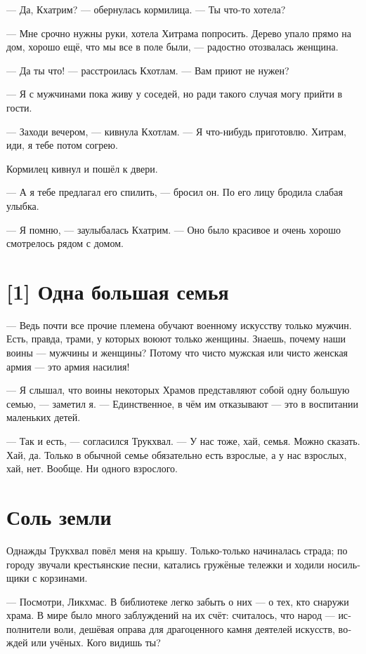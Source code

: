 \documentclass[a4paper,12pt,fleqn]{book}\usepackage{polyglossia}\setdefaultlanguage[babelshorthands=true]{russian}\setotherlanguage{english}\defaultfontfeatures{Ligatures=TeX,Mapping=tex-text}\usepackage{xcolor}\newcommand{\ml}[3]{#2}
\begin{document}
{--- Да, Кхатрим? --- обернулась кормилица.
--- Ты что-то хотела?

--- Мне срочно нужны руки, хотела Хитрама попросить.
Дерево упало прямо на дом, хорошо ещё, что мы все в поле были, --- радостно отозвалась женщина.

--- Да ты что! --- расстроилась Кхотлам.
--- Вам приют не нужен?

--- Я с мужчинами пока живу у соседей, но ради такого случая могу прийти в гости.

--- Заходи вечером, --- кивнула Кхотлам.
--- Я что-нибудь приготовлю.
Хитрам, иди, я тебе потом согрею.

Кормилец кивнул и пошёл к двери.

--- А я тебе предлагал его спилить, --- бросил он.
По его лицу бродила слабая улыбка.

--- Я помню, --- заулыбалась Кхатрим.
--- Оно было красивое и очень хорошо смотрелось рядом с домом.

\section{[1] Одна большая семья}

--- Ведь почти все прочие племена обучают военному искусству только мужчин.
Есть, правда, трами, у которых воюют только женщины.
Знаешь, почему наши воины --- мужчины и женщины?
Потому что чисто мужская или чисто женская армия --- это армия насилия!

--- Я слышал, что воины некоторых Храмов представляют собой одну большую семью, --- заметил я.
--- Единственное, в чём им отказывают --- это в воспитании маленьких детей.

--- Так и есть, --- согласился Трукхвал.
--- У нас тоже, хай, семья.
Можно сказать.
Хай, да.
Только в обычной семье обязательно есть взрослые, а у нас взрослых, хай, нет.
Вообще.
Ни одного взрослого.

\section{Соль земли}

Однажды Трукхвал повёл меня на крышу.
Только-только начиналась страда;
по городу звучали крестьянские песни, катались гружёные тележки и ходили носильщики с корзинами.

--- Посмотри, Ликхмас.
В библиотеке легко забыть о них --- о тех, кто снаружи храма.
В мире было много заблуждений на их счёт: считалось, что народ --- исполнители воли, дешёвая оправа для драгоценного камня деятелей искусств, вождей или учёных.
Кого видишь ты?

}
\end{document}
